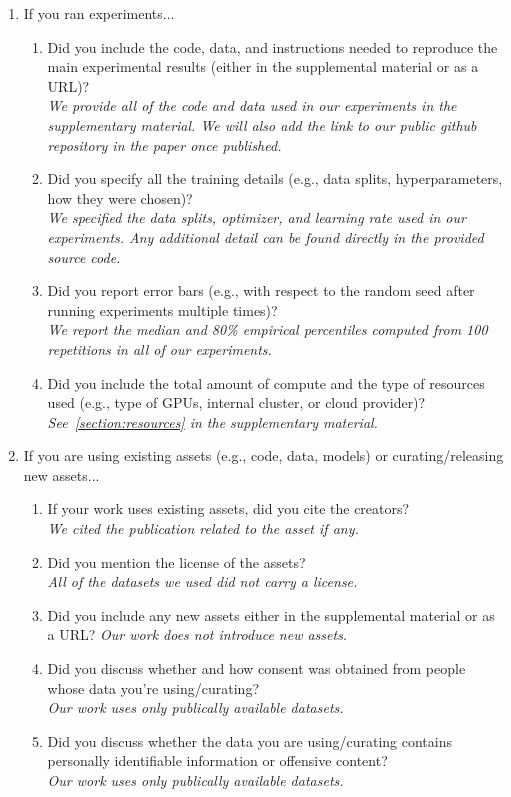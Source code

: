 \begin{enumerate}
\item If you ran experiments...
\begin{enumerate}
  \item Did you include the code, data, and instructions needed to reproduce the main experimental results (either in the supplemental material or as a URL)?
    \answerYes{} \\
    \textit{We provide all of the code and data used in our experiments in the supplementary material.
    We will also add the link to our public github repository in the paper once published.}
  \item Did you specify all the training details (e.g., data splits, hyperparameters, how they were chosen)?
    \answerYes{} \\
    \textit{We specified the data splits, optimizer, and learning rate used in our experiments.
    Any additional detail can be found directly in the provided source code.}
  \item Did you report error bars (e.g., with respect to the random seed after running experiments multiple times)?
    \answerYes{} \\
    \textit{We report the median and 80\% empirical percentiles computed from 100 repetitions in all of our experiments.}
     \item Did you include the total amount of compute and the type of resources used (e.g., type of GPUs, internal cluster, or cloud provider)? 
     \answerYes{} \\
     \textit{See~\cref{section:resources} in the supplementary material.}
\end{enumerate}

\item If you are using existing assets (e.g., code, data, models) or curating/releasing new assets...
\begin{enumerate}
  \item If your work uses existing assets, did you cite the creators?
    \answerYes{} \\
    \textit{We cited the publication related to the asset if any.}
  \item Did you mention the license of the assets?
    \answerNo{} \\
    \textit{All of the datasets we used did not carry a license.}
  \item Did you include any new assets either in the supplemental material or as a URL?
    \answerNA{}
    \textit{Our work does not introduce new assets.}
  \item Did you discuss whether and how consent was obtained from people whose data you're using/curating?
    \answerNA{} \\
    \textit{Our work uses only publically available datasets.}
  \item Did you discuss whether the data you are using/curating contains personally identifiable information or offensive content?
    \answerNA{} \\
    \textit{Our work uses only publically available datasets.}
\end{enumerate}


\end{enumerate}
